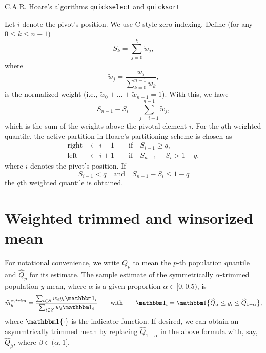 \documentclass[a4paper,11pt]{scrreprt}
\begin{document}
C.A.R. Hoare's algorithms \texttt{quickselect} and \texttt{quicksort} \citep[see e.g.][p. 113--123, and Exercise 31 on p. 136]{knuth1998v3}


Let $i$ denote the pivot's position. We use C style zero indexing. Define (for any $0\leq k \leq n-1$)  
\begin{equation*}
   S_k = \sum_{j=0}^k \tilde{w}_j,
\end{equation*}
\noindent where 
\begin{equation*}
   \tilde{w}_j = \frac{w_j}{\sum_{k=0}^{n-1}w_k},
\end{equation*}
\noindent is the normalized weight (i.e., $\tilde{w}_0 + \ldots + \tilde{w}_{n-1} = 1$). With this, we have
\begin{equation*}
   S_{n-1} - S_i = \sum_{j=i+1}^{n-1}\tilde{w}_j,
\end{equation*}
\noindent which is the sum of the weights above the pivotal element $i$. For the $q$th weighted quantile, the active partition in Hoare's partitioning scheme is chosen as 
\begin{align*}
   \mathrm{right} &\leftarrow i - 1 \qquad \text{if} \quad  S_{i-1} \geq q, \\
   \mathrm{left} &\leftarrow i + 1  \qquad \text{if} \quad  S_{n-1} - S_{i} > 1-q,  
\end{align*}
\noindent where $i$ denotes the pivot's position. If 
\begin{equation*}
   S_{i-1} < q \quad \text{and} \quad  S_{n-1} - S_{i} \leq 1-q  
\end{equation*}
\noindent the $q$th weighted quantile is obtained. 

 

\section{Weighted trimmed and winsorized mean}
For notational convenience, we write $Q_p$ to mean the $p$-th population quantile and $\widehat{Q}_p$ for its estimate. The sample estimate of the symmetrically $\alpha$-trimmed population $y$-mean, where $\alpha$ is a given proportion $\alpha \in [0,0.5)$, is 
\begin{equation*}
   \widehat{m}_y^{\alpha, trim} =  \frac{\sum_{i \in S} w_i y_i  \indicator_i }{\sum_{i \in S} w_i \indicator_i} \qquad \text{with} \qquad  \indicator_i = \indicator \big\{\widehat{Q}_{\alpha} \leq y_i \leq \widehat{Q}_{1-\alpha} \big\},
\end{equation*}
\noindent  where $\indicator\{\cdot\}$ is the indicator function. If desired, we can obtain an asymmtrically trimmed mean by replacing $\widehat{Q}_{1-\alpha}$ in the above formula with, say, $\widehat{Q}_{\beta}$, where $\beta \in (\alpha, 1]$. 
\end{document}
